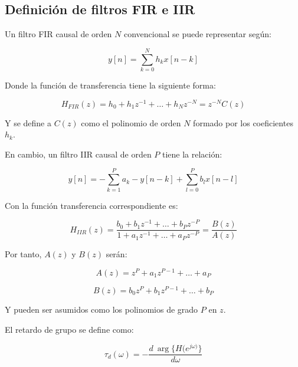 \subsection{Definición de filtros FIR e IIR}
    Un filtro FIR causal de orden $N$ convencional se puede representar según:

    \begin{equation}
      y[n] = \sum_{k=0}^{N}{h_k x[n-k]}
    \end{equation}

    Donde la función de transferencia tiene la siguiente forma:

    \begin{equation}
      H_{FIR}(z) = h_0 + h_1 z^{-1} + \ldots + h_N z^{-N} = z^{-N} C(z)
    \end{equation}

    Y se define a $C(z)$ como el polinomio de orden $N$ formado por los coeficientes $h_k$.

    En cambio, un filtro IIR causal de orden $P$ tiene la relación:

    \begin{equation}
      y[n] = - \sum_{k=1}^{P}{a_k - y[n-k]} + \sum_{l=0}^{P}{b_l x[n-l]}
    \end{equation}

    Con la función transferencia correspondiente es:

    \begin{equation}
      H_{IIR}(z) = \frac{b_0 + b_1 z^{-1} + \ldots + b_P z^{-P}}{1 + a_1 z^{-1} + \ldots + a_P z^{-P}} = \frac{B(z)}{A(z)}
      \label{eq:6}
    \end{equation}

    Por tanto, $A(z)$ y $B(z)$ serán:

    \begin{equation}
      A(z) = z^{P} + a_1 z^{P-1} + \ldots + a_P
      \label{eq:8}
    \end{equation}

    \begin{equation}
      B(z) = b_0 z^P + b_1 z^{P-1} + \ldots + b_P
      \label{eq:9}
    \end{equation}

    Y pueden ser asumidos como los polinomios de grado $P$ en $z$.

    El retardo de grupo se define como:

    \begin{equation}
      \tau_d(\omega) = - \frac{d \: \arg\{H(e^{j\omega)}\}}{d\omega}
    \end{equation}

